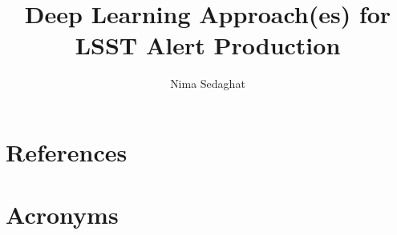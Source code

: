 \documentclass[DM,authoryear,toc]{lsstdoc}
\title{Deep Learning Approach(es) for LSST Alert Production}
\author{%
Nima Sedaghat
}
\date{\vcsDate}
\begin{document}
\maketitle



\appendix
\section{References} \label{sec:bib}
\renewcommand{\refname}{} %


\section{Acronyms} \label{sec:acronyms}

\end{document}
